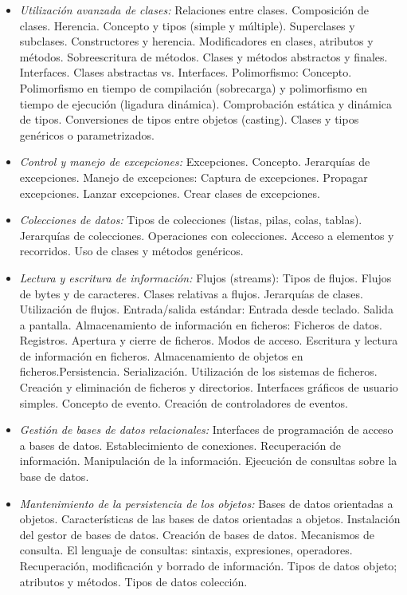 \begin{itemize}[itemsep=0.1em, topsep=0.1em]
\item\emph{Utilización avanzada de clases:}
Relaciones entre clases. Composición de clases.
Herencia. Concepto y tipos (simple y múltiple).
Superclases y subclases.
Constructores y herencia.
Modificadores en clases, atributos y métodos.
Sobreescritura de métodos.
Clases y métodos abstractos y finales.
Interfaces. Clases abstractas vs. Interfaces.
Polimorfismo: Concepto.  Polimorfismo en tiempo de compilación (sobrecarga) y polimorfismo en tiempo de ejecución (ligadura dinámica).  Comprobación estática y dinámica de tipos.
Conversiones de tipos entre objetos (casting).
Clases y tipos genéricos o parametrizados.
\item\emph{Control y manejo de excepciones:}
Excepciones. Concepto.
Jerarquías de excepciones.
Manejo de excepciones:  Captura de excepciones.  Propagar excepciones.  Lanzar excepciones.  Crear clases de excepciones.
\item\emph{Colecciones de datos:}
Tipos de colecciones (listas, pilas, colas, tablas).
Jerarquías de colecciones.
Operaciones con colecciones. Acceso a elementos y recorridos.
Uso de clases y métodos genéricos.
\item\emph{Lectura y escritura de información:}
Flujos (streams): Tipos de flujos. Flujos de bytes y de caracteres. Clases relativas a flujos. Jerarquías de clases. Utilización de flujos.
Entrada/salida estándar: Entrada desde teclado. Salida a pantalla.
Almacenamiento de información en ficheros: Ficheros de datos. Registros. Apertura y cierre de ficheros. Modos de acceso. Escritura y lectura de información en ficheros. Almacenamiento de objetos en ficheros.Persistencia. Serialización. Utilización de los sistemas de ficheros. Creación y eliminación de ficheros y directorios.
Interfaces gráficos de usuario simples. Concepto de evento. Creación de controladores de eventos.
\item\emph{Gestión de bases de datos relacionales:}
Interfaces de programación de acceso a bases de datos.
Establecimiento de conexiones.
Recuperación de información.
Manipulación de la información.
Ejecución de consultas sobre la base de datos.
\item\emph{Mantenimiento de la persistencia de los objetos:}
Bases de datos orientadas a objetos.
Características de las bases de datos orientadas a objetos.
Instalación del gestor de bases de datos.
Creación de bases de datos.
Mecanismos de consulta.
El lenguaje de consultas: sintaxis, expresiones, operadores.
Recuperación, modificación y borrado de información.
Tipos de datos objeto; atributos y métodos.
Tipos de datos colección.
\end{itemize}